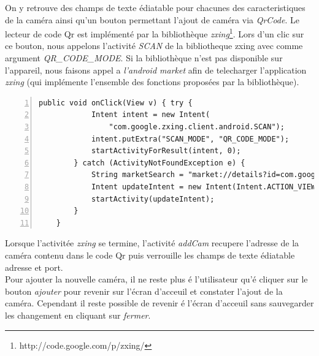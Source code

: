 On y retrouve des champs de texte édiatable pour chacunes
des caracteristiques de la caméra ainsi qu'un bouton permettant l'ajout de caméra via
\textit{QrCode}.
\indent Le lecteur de code Qr est implémenté par la bibliothèque
\textit{zxing}\footnote{\label{zxing} http://code.google.com/p/zxing/}. \newline
Lors d'un clic sur ce bouton, nous appelons l'activité 
\textit{SCAN} de la bibliotheque zxing avec comme argument
\textit{QR\_CODE\_MODE}.\newline
Si la bibliothèque n'est pas disponible sur l'appareil, nous faisons appel a
\textit{l'android market} afin de telecharger l'application \textit{zxing} (qui
implémente l'ensemble des fonctions proposées par la bibliothèque).
\newpage
\begin{lstlisting}[caption={Lancement de l'activité zxing ou de l'android
market.},  framexleftmargin=7mm, numbers=left] 
    public void onClick(View v) { try {
            Intent intent = new Intent(
                "com.google.zxing.client.android.SCAN");
            intent.putExtra("SCAN_MODE", "QR_CODE_MODE");
            startActivityForResult(intent, 0);
        } catch (ActivityNotFoundException e) {
            String marketSearch = "market://details?id=com.google.zxing.client.android";
            Intent updateIntent = new Intent(Intent.ACTION_VIEW, Uri.parse(marketSearch));
            startActivity(updateIntent);
        }
    }
\end{lstlisting}

\indent \newline
\indent Lorsque l'activitée \textit{zxing} se termine, l'activité
\textit{addCam} recupere l'adresse de la caméra contenu dans le code Qr puis verrouille les
champs de texte édiatable adresse et port.\\
\indent Pour ajouter la nouvelle
caméra, il ne reste plus  é l'utilisateur qu'é cliquer sur le bouton
\textit{ajouter} pour revenir sur l'écran d'acceuil et constater l'ajout de la caméra. Cependant il reste possible de revenir é l'écran d'acceuil sans sauvegarder les changement en cliquant sur \textit{fermer}.

